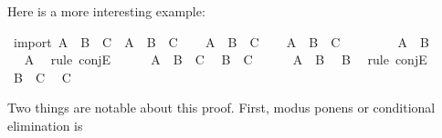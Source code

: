 \begin{isabellebody}
\isamarkupfalse%
%
\endisatagproof
{\isafoldproof}%
%
\isadelimproof
%
\endisadelimproof
%
\begin{isamarkuptext}%
Here is a more interesting example:%
\end{isamarkuptext}\isamarkuptrue%
\isamarkupfalse%
\ import{\isacharcolon}\ {\isachardoublequoteopen}{\isacharparenleft}A\ {\isasymlongrightarrow}\ B\ {\isasymlongrightarrow}\ C{\isacharparenright}\ {\isasymlongrightarrow}\ {\isacharparenleft}A\ {\isasymand}\ B\ {\isasymlongrightarrow}\ C{\isacharparenright}{\isachardoublequoteclose}\isanewline
%
\isadelimproof
%
\endisadelimproof
%
\isatagproof
{}\isamarkupfalse%
\isanewline
\ \ \isamarkupfalse%
\ {\isachardoublequoteopen}A\ {\isasymlongrightarrow}\ B\ {\isasymlongrightarrow}\ C{\isachardoublequoteclose}\isanewline
\ \ \isamarkupfalse%
\ {\isachardoublequoteopen}A\ {\isasymand}\ B\ {\isasymlongrightarrow}\ C{\isachardoublequoteclose}\isanewline
\ \ \isamarkupfalse%
\isanewline
\ \ \ \ \isamarkupfalse%
\ {\isachardoublequoteopen}A\ {\isasymand}\ B{\isachardoublequoteclose}\isanewline
\ \ \ \ \isamarkupfalse%
\ \isamarkupfalse%
\ {\isachardoublequoteopen}A{\isachardoublequoteclose}\ \isamarkupfalse%
\ {\isacharparenleft}rule\ conjE{\isacharparenright}\isanewline
\ \ \ \ \isamarkupfalse%
\ {\isacharbackquoteopen}A\ {\isasymlongrightarrow}\ B\ {\isasymlongrightarrow}\ C{\isacharbackquoteclose}\ \isamarkupfalse%
\ {\isachardoublequoteopen}B\ {\isasymlongrightarrow}\ C{\isachardoublequoteclose}\isacommand{{\isachardot}{\isachardot}}\isamarkupfalse%
\isanewline
\ \ \ \ \isamarkupfalse%
\ {\isacharbackquoteopen}A\ {\isasymand}\ B{\isacharbackquoteclose}\ \isamarkupfalse%
\ {\isachardoublequoteopen}B{\isachardoublequoteclose}\ \isamarkupfalse%
\ {\isacharparenleft}rule\ conjE{\isacharparenright}\isanewline
\ \ \ \ \isamarkupfalse%
\ {\isacharbackquoteopen}B\ {\isasymlongrightarrow}\ C{\isacharbackquoteclose}\ \isamarkupfalse%
\ {\isachardoublequoteopen}C{\isachardoublequoteclose}\isacommand{{\isachardot}{\isachardot}}\isamarkupfalse%
\isanewline
\ \ \isamarkupfalse%
\isanewline
{}\isamarkupfalse%
%
\endisatagproof
{\isafoldproof}%
%
\isadelimproof
%
\endisadelimproof
%
\begin{isamarkuptext}%
Two things are notable about this proof. First, modus ponens or conditional elimination is

\end{isamarkuptext}
\end{isabellebody}
